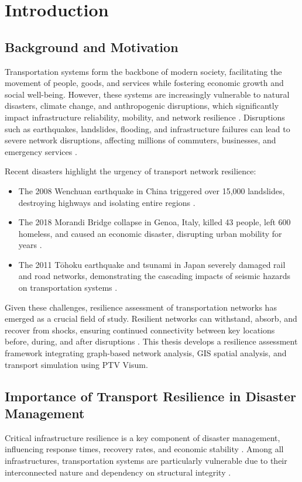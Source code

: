 \chapter{Introduction}

\section{Background and Motivation}
Transportation systems form the backbone of modern society, facilitating the movement of people, goods, and services while fostering economic growth and social well-being. However, these systems are increasingly vulnerable to natural disasters, climate change, and anthropogenic disruptions, which significantly impact infrastructure reliability, mobility, and network resilience \cite{pescaroli2016}. Disruptions such as earthquakes, landslides, flooding, and infrastructure failures can lead to severe network disruptions, affecting millions of commuters, businesses, and emergency services \cite{gu2020, wu2021}.

Recent disasters highlight the urgency of transport network resilience:
\begin{itemize}
    \item The 2008 Wenchuan earthquake in China triggered over 15,000 landslides, destroying highways and isolating entire regions \cite{tang2011}.
    \item The 2018 Morandi Bridge collapse in Genoa, Italy, killed 43 people, left 600 homeless, and caused an economic disaster, disrupting urban mobility for years \cite{scozzese2019}.
    \item The 2011 Tōhoku earthquake and tsunami in Japan severely damaged rail and road networks, demonstrating the cascading impacts of seismic hazards on transportation systems \cite{krausmann2013}.
\end{itemize}

\justify Given these challenges, resilience assessment of transportation networks has emerged as a crucial field of study. Resilient networks can withstand, absorb, and recover from shocks, ensuring continued connectivity between key locations before, during, and after disruptions \cite{yang2022}. This thesis develops a resilience assessment framework integrating graph-based network analysis, GIS spatial analysis, and transport simulation using PTV Visum.

\section{Importance of Transport Resilience in Disaster Management}
Critical infrastructure resilience is a key component of disaster management, influencing response times, recovery rates, and economic stability . Among all infrastructures, transportation systems are particularly vulnerable due to their interconnected nature and dependency on structural integrity \cite{gu2020}.

